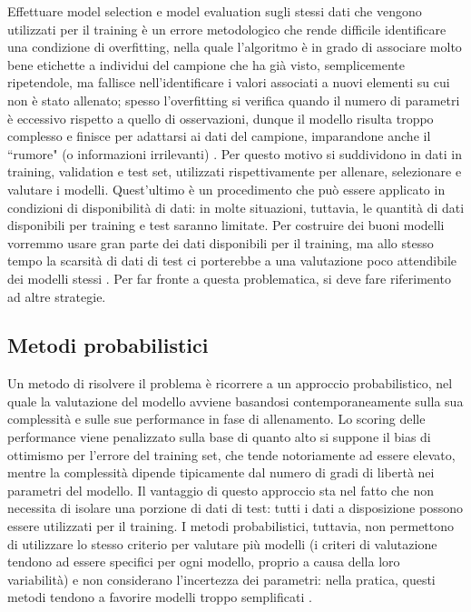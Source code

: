 \documentclass[12pt,a4paper]{report}
\begin{document}
Effettuare model selection e model evaluation sugli stessi dati che vengono utilizzati per il training  è un errore metodologico \cite{scikit-learn} che rende difficile identificare una condizione di overfitting, nella quale l'algoritmo è in grado di associare molto bene etichette a individui del campione che ha già visto, semplicemente ripetendole, ma fallisce nell'identificare i valori associati a nuovi elementi su cui non è stato allenato; spesso l'overfitting si verifica quando il numero di parametri è eccessivo rispetto a quello di osservazioni, dunque il modello risulta troppo complesso e finisce per adattarsi ai dati del campione, imparandone anche il ``rumore" (o informazioni irrilevanti) \cite{IBMlearning}.
Per questo motivo si suddividono in dati in training, validation e test set, utilizzati rispettivamente per allenare, selezionare e valutare i modelli.
Quest'ultimo è un procedimento che può essere applicato in condizioni di disponibilità di dati: in molte situazioni, tuttavia, le quantità di dati disponibili per training e test saranno limitate. Per costruire dei buoni modelli vorremmo usare gran parte dei dati disponibili per il training, ma allo stesso tempo la scarsità di dati di test ci porterebbe a una valutazione poco attendibile dei modelli stessi \cite{patternRecognitionML}.	
Per far fronte a questa problematica, si deve fare riferimento ad altre strategie.

\subsection{Metodi probabilistici}

Un metodo di risolvere il problema è ricorrere a un approccio probabilistico, nel quale la valutazione del modello avviene basandosi contemporaneamente sulla sua complessità e sulle sue performance in fase di allenamento.
Lo scoring delle performance viene penalizzato sulla base di quanto alto si suppone il bias di ottimismo per l'errore del training set, che tende notoriamente ad essere elevato, mentre la complessità dipende tipicamente dal numero di gradi di libertà nei parametri del modello.
Il vantaggio di questo approccio sta nel fatto che non necessita di isolare una porzione di dati di test: tutti i dati a disposizione possono essere utilizzati per il training. I metodi probabilistici, tuttavia, non permettono di utilizzare lo stesso criterio per valutare più modelli (i criteri di valutazione tendono ad essere specifici per ogni modello, proprio a causa della loro variabilità) e non considerano l'incertezza dei parametri: nella pratica, questi metodi tendono a favorire modelli troppo semplificati \cite{APM}.
\end{document}
